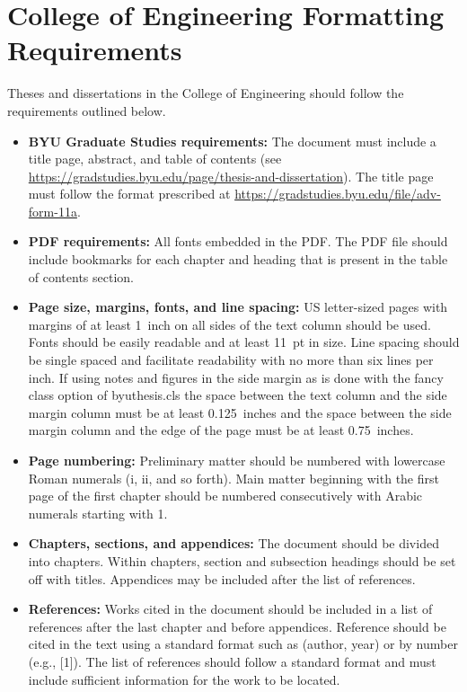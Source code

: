 \chapter{College of Engineering Formatting Requirements}
\label{app:format}

Theses and dissertations in the College of Engineering should follow the requirements outlined below.

\begin{itemize}
 \item {\bfseries BYU Graduate Studies requirements:}  The document must include a title page, abstract, and table of contents (see \url{https://gradstudies.byu.edu/page/thesis-and-dissertation}). The title page must follow the format prescribed at \url{https://gradstudies.byu.edu/file/adv-form-11a}.  

\item {\bfseries PDF requirements:} All fonts embedded in the PDF. The PDF file should include bookmarks for each chapter and heading that is present in the table of contents section.

\item {\bfseries Page size, margins, fonts, and line spacing:} US letter-sized pages with margins of at least 1~inch on all sides of the text column should be used. Fonts should be easily readable and at least 11~pt in size. Line spacing should be single spaced and facilitate readability with no more than six lines per inch. If using notes and figures in the side margin as is done with the {\ttfamily fancy} class option of {\ttfamily byuthesis.cls} the space between the text column and the side margin column must be at least 0.125~inches and the space between the side margin column and the edge of the page must be at least 0.75~inches. 

\item {\bfseries Page numbering:} Preliminary matter should be numbered with lowercase Roman numerals (i, ii, and so forth). Main matter beginning with the first page of the first chapter should be numbered consecutively with Arabic numerals starting with 1. 

\item {\bfseries Chapters, sections, and appendices:} The document should be divided into chapters. Within chapters, section and subsection headings should be set off with titles. Appendices may be included after the list of references.

\item {\bfseries References:} Works cited in the document should be included in a list of references after the last chapter and before appendices. Reference should be cited in the text using a standard format such as (author, year) or by number (e.g., [1]). The list of references should follow a standard format and must include sufficient information for the work to be located. 


\end{itemize}

